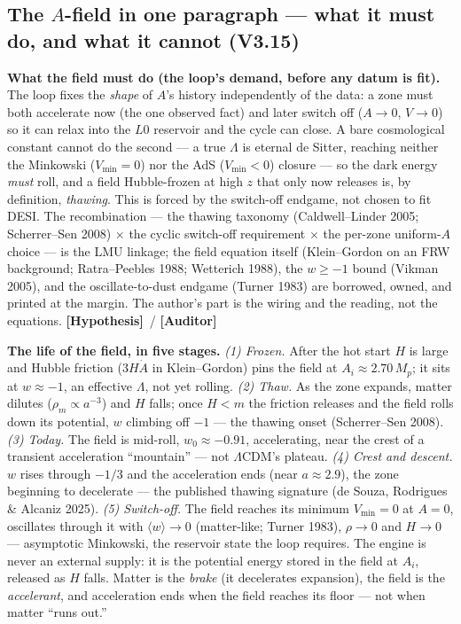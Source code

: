 \documentclass[11pt]{article}
\newcommand{\Hyp}{\textbf{\textcolor{blue!55!black}{[Hypothesis]}}}
\newcommand{\Auditor}{\textbf{\textcolor{teal!55!black}{[Auditor]}}}
\begin{document}
\subsection*{The $A$-field in one paragraph --- what it must do, and what it cannot (V3.15)}
\noindent\textbf{What the field must do (the loop's demand, before any datum is fit).} The loop fixes the \emph{shape} of $A$'s history independently of the data: a zone must both accelerate now (the one observed fact) and later switch off ($A\to0$, $V\to0$) so it can relax into the $L0$ reservoir and the cycle can close. A bare cosmological constant cannot do the second --- a true $\Lambda$ is eternal de Sitter, reaching neither the Minkowski ($V_{\min}=0$) nor the AdS ($V_{\min}<0$) closure --- so the dark energy \emph{must} roll, and a field Hubble-frozen at high $z$ that only now releases is, by definition, \emph{thawing}. This is forced by the switch-off endgame, not chosen to fit DESI. The recombination --- the thawing taxonomy (Caldwell--Linder 2005; Scherrer--Sen 2008) $\times$ the cyclic switch-off requirement $\times$ the per-zone uniform-$A$ choice --- is the LMU linkage; the field equation itself (Klein--Gordon on an FRW background; Ratra--Peebles 1988; Wetterich 1988), the $w\ge-1$ bound (Vikman 2005), and the oscillate-to-dust endgame (Turner 1983) are borrowed, owned, and printed at the margin. The author's part is the wiring and the reading, not the equations. \Hyp\ / \Auditor

\noindent\textbf{The life of the field, in five stages.} \emph{(1) Frozen.} After the hot start $H$ is large and Hubble friction ($3H\dot A$ in Klein--Gordon) pins the field at $A_i\approx2.70\,M_p$; it sits at $w\approx-1$, an effective $\Lambda$, not yet rolling. \emph{(2) Thaw.} As the zone expands, matter dilutes ($\rho_m\propto a^{-3}$) and $H$ falls; once $H<m$ the friction releases and the field rolls down its potential, $w$ climbing off $-1$ --- the thawing onset (Scherrer--Sen 2008). \emph{(3) Today.} The field is mid-roll, $w_0\approx-0.91$, accelerating, near the crest of a transient acceleration ``mountain'' --- not $\Lambda$CDM's plateau. \emph{(4) Crest and descent.} $w$ rises through $-1/3$ and the acceleration ends (near $a\approx2.9$), the zone beginning to decelerate --- the published thawing signature (de Souza, Rodrigues \& Alcaniz 2025). \emph{(5) Switch-off.} The field reaches its minimum $V_{\min}=0$ at $A=0$, oscillates through it with $\langle w\rangle\to0$ (matter-like; Turner 1983), $\rho\to0$ and $H\to0$ --- asymptotic Minkowski, the reservoir state the loop requires. The engine is never an external supply: it is the potential energy stored in the field at $A_i$, released as $H$ falls. Matter is the \emph{brake} (it decelerates expansion), the field is the \emph{accelerant}, and acceleration ends when the field reaches its floor --- not when matter ``runs out.''
\end{document}
